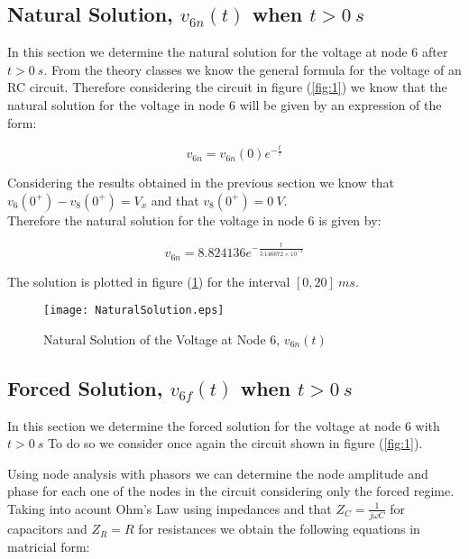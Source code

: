 \subsection{Natural Solution, $v_{6n}(t)$ when $t > 0 \:s$}

In this section we determine the natural solution for the voltage at node 6 after $t > 0 \:s$.
From the theory classes we know the general formula for the voltage of an RC circuit. 
Therefore considering the circuit in figure (\ref{fig:1}) we know that the natural solution for the voltage in node 6 
will be given by an expression of the form:

\begin{equation}
  v_{6n} = v_{6n}(0) e^{-\frac{t}{\tau}}
  \label{eq:NaturalSolutionExpression}
\end{equation}

Considering the results obtained in the previous section we know that $v_{6}(0^{+}) - v_{8}(0^{+}) = V_x$ and that $v_{8}(0^{+}) = 0 \:V$.
\\
Therefore the natural solution for the voltage in node 6 is given by:

\begin{equation}
  v_{6n} = 8.824136 e^{-\frac{t}{3.146672 \times 10^{-3}}}
  \label{eq:NaturalSolution}
\end{equation}

The solution is plotted in figure (\ref{fig:NaturalSolution}) for the interval $[0, 20] \:ms$.

\begin{figure}[H] \centering
\texttt{[image: NaturalSolution.eps]}
\caption{Natural Solution of the Voltage at Node 6, $v_{6n}(t)$}
\label{fig:NaturalSolution}
\end{figure}


\subsection{Forced Solution, $v_{6f}(t)$ when $t > 0 \:s$}

In this section we determine the forced solution for the voltage at node 6 with $t > 0 \: s$
To do so we consider once again the circuit shown in figure (\ref{fig:1}).

Using node analysis with phasors we can determine the node amplitude and phase for each one of the nodes in the circuit
considering only the forced regime.
Taking into acount Ohm's Law using impedances and that $Z_C = \frac{1}{j \omega C}$ for capacitors and $Z_R = R$ 
for resistances we obtain the following equations in matricial form:

